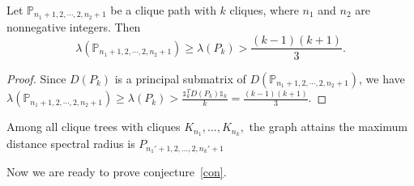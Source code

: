 \documentclass[10pt]{article}
\begin{document}
\begin{lemma}\label{Lem3}
Let  $\mathbb{P}_{n_1+1,2,\cdots,2,n_2+1}$ be a clique path with $k$ cliques, where $n_1$ and $n_2$  are nonnegative integers. Then
$$\lambda(\mathbb{P}_{n_1+1,2,\cdots,2,n_2+1})\ge \lambda(P_{k})> \frac{(k-1)(k+1)}{3}.$$
\end{lemma}
\begin{proof}
Since $D(P_{k})$ is a principal submatrix of $D({\mathbb{P}_{n_1+1,2,\cdots,2,n_2+1}})$, we have
$\lambda(\mathbb{P}_{n_1+1,2,\cdots,2,n_2+1})\ge \lambda(P_{k})>\frac{\mathbb{1}_k^TD(P_{k})\mathbb{1}_k}{k}=\frac{(k-1)(k+1)}{3}.$
\end{proof}
\begin{lemma}\label{L2.7}\cite{Linl2015}
Among all clique trees with cliques $K_{n_1},...,K_{n_k},$ the graph attains the maximum distance spectral radius is $P_{n_1'+1,2,...,2,n_k'+1}$
\end{lemma}
Now  we  are ready to prove conjecture~\ref{con}.
\end{document}
